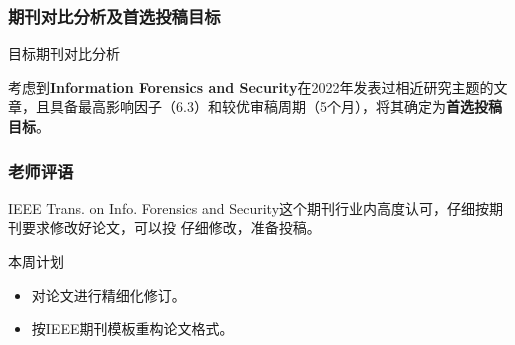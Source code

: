 \documentclass{beamer}
\begin{document}
\begin{frame}
    \frametitle{期刊对比分析及首选投稿目标}
    
    \begin{table}[ht]
      \centering
      \caption{目标期刊对比分析}
      \label{tab:journal}
      \small
      \caption*{年文章数：为该期刊2024年发表的文章数。审稿周期：查看最新一期的文章，计算从投稿到发表的时间，三篇取平均值。}
  \end{table}
    
    
    考虑到\textbf{Information Forensics and Security}在2022年发表过相近研究主题的文章，且具备最高影响因子（6.3）和较优审稿周期（5个月），将其确定为\textbf{首选投稿目标}。
\end{frame}

\begin{frame}
  \frametitle{老师评语}

  \begin{block}{IEEE Trans. on Info. Forensics and Security这个期刊行业内高度认可，仔细按期刊要求修改好论文，可以投}
      仔细修改，准备投稿。
  \end{block}
  \begin{alertblock}{本周计划}
      \begin{itemize}
          \item 对论文进行精细化修订。
          \item 按IEEE期刊模板重构论文格式。
      \end{itemize}
  \end{alertblock}
\end{frame}
\end{document}

